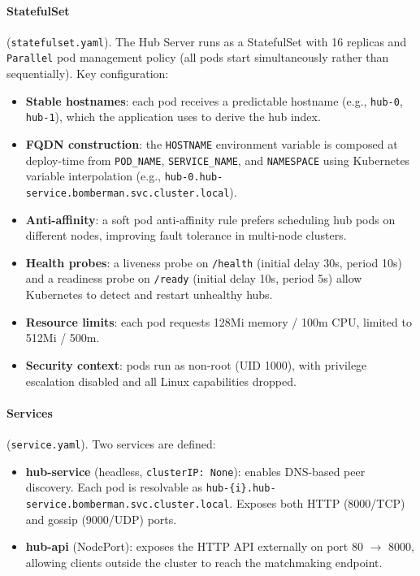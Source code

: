 \paragraph{StatefulSet} (\texttt{statefulset.yaml}).
The Hub Server runs as a StatefulSet with 16 replicas and \texttt{Parallel} pod management policy (all pods start simultaneously rather than sequentially).
Key configuration:
\begin{itemize}
  \item \textbf{Stable hostnames}: each pod receives a predictable hostname (e.g., \texttt{hub-0}, \texttt{hub-1}), which the application uses to derive the hub index.
  \item \textbf{FQDN construction}: the \texttt{HOSTNAME} environment variable is composed at deploy-time from \texttt{POD\_NAME}, \texttt{SERVICE\_NAME}, and \texttt{NAMESPACE} using Kubernetes variable interpolation (e.g., \texttt{hub-0.hub-service.bomberman.svc.cluster.local}).
  \item \textbf{Anti-affinity}: a soft pod anti-affinity rule prefers scheduling hub pods on different nodes, improving fault tolerance in multi-node clusters.
  \item \textbf{Health probes}: a liveness probe on \texttt{/health} (initial delay 30s, period 10s) and a readiness probe on \texttt{/ready} (initial delay 10s, period 5s) allow Kubernetes to detect and restart unhealthy hubs.
  \item \textbf{Resource limits}: each pod requests 128Mi memory / 100m CPU, limited to 512Mi / 500m.
  \item \textbf{Security context}: pods run as non-root (UID 1000), with privilege escalation disabled and all Linux capabilities dropped.
\end{itemize}

\paragraph{Services} (\texttt{service.yaml}).
Two services are defined:
\begin{itemize}
  \item \textbf{hub-service} (headless, \texttt{clusterIP: None}): enables DNS-based peer discovery. Each pod is resolvable as \texttt{hub-\{i\}.hub-service.bomberman.svc.cluster.local}. Exposes both HTTP (8000/TCP) and gossip (9000/UDP) ports.
  \item \textbf{hub-api} (NodePort): exposes the HTTP API externally on port 80 $\rightarrow$ 8000, allowing clients outside the cluster to reach the matchmaking endpoint.
\end{itemize}

